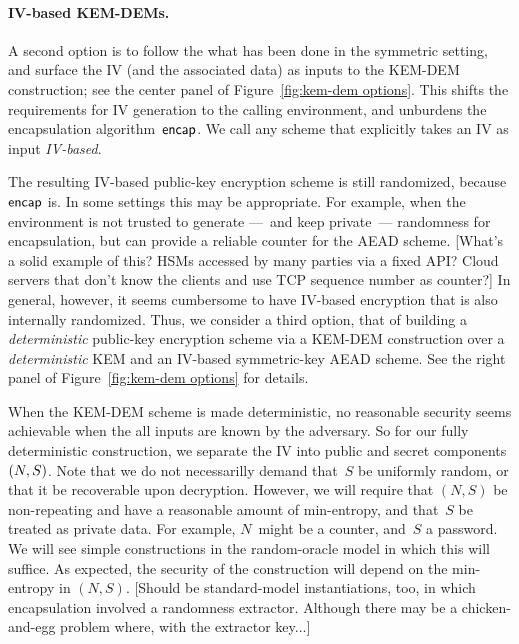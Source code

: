 \paragraph{IV-based KEM-DEMs. }
A second option is to follow the what has been done in the symmetric setting, and surface the IV (and the associated data) as inputs to the KEM-DEM construction; see the center panel of Figure~\ref{fig:kem-dem options}.  
This shifts the requirements for IV generation to the calling environment, and unburdens the encapsulation algorithm~$\mathsf{encap}$.  We call any scheme that explicitly takes an IV as input \emph{IV-based}.  

The resulting IV-based public-key encryption scheme is still randomized, because $\mathsf{encap}$ is.  In some settings this may be appropriate.  For example, when the environment is not trusted to generate ---~and keep private~--- randomness for encapsulation, but can provide a reliable counter for the AEAD scheme.  [What's a solid example of this?  HSMs accessed by many parties via a fixed API?  Cloud servers that don't know the clients and use TCP sequence number as counter?]  In general, however, it seems cumbersome to have IV-based encryption that is also internally randomized.  
Thus, we consider a third option, that of building a \emph{deterministic} public-key encryption scheme via a KEM-DEM construction over a \emph{deterministic} KEM and an IV-based symmetric-key AEAD scheme.  See the right panel of Figure~\ref{fig:kem-dem options} for details.  

When the KEM-DEM scheme is made deterministic, no reasonable security seems achievable when the all inputs are known by the adversary.  So for our fully deterministic construction, we separate the IV into public and secret components $(N,S)$.   
Note that we do not necessarilly demand that~$S$ be uniformly random, or that it be recoverable upon decryption.  However, we will require that $(N,S)$ be non-repeating and have a reasonable amount of min-entropy, and that~$S$ be treated as private data.  For example, $N$~might be a counter, and~$S$ a password.  We will see simple constructions in the random-oracle model in which this will suffice. As expected, the security of the construction will depend on the min-entropy in $(N,S)$. [Should be standard-model instantiations, too, in which encapsulation involved a randomness extractor.  Although there may be a chicken-and-egg problem where, with the extractor key...]


